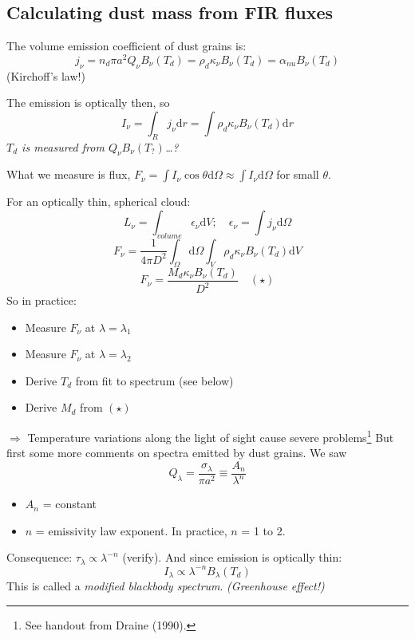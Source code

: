 \documentclass[12pt]{article}
\newcommand{\mar}[1]{\hspace{0pt}\marginpar{-\textcolor{black}{#1}-}}
\newcommand{\mynotes}[1]{{\fontfamily{cmss}\selectfont \textit{#1}}}
\begin{document}
\subsection{Calculating dust mass from FIR fluxes}
The volume emission coefficient of dust grains is:
\[
    j_{\nu}
    = n_{d} \pi a^{2} Q_{\nu} B_{\nu} (T_{d})
    = \rho_{d} \kappa_{\nu} B_{\nu} (T_{d})
    = \alpha_{nu} B_{\nu} (T_{d})
    \]
(Kirchoff's law!)

\mar{107}The emission is optically then, so
\[
    I_{\nu}
    = \int_{R}{
        j_{\nu} \mathrm{d}r}
    = \int{
        \rho_{d} \kappa_{\nu} B_{\nu} (T_{d}) \mathrm{d}r}
    \]
\mynotes{$T_{d}$ is measured from $Q_{\nu}B_{\nu}(T_{?})$\ldots ?}

What we measure is flux,
$F_{\nu} = \int I_{\nu} \cos \theta \mathrm{d}\Omega
\approx \int I_{\nu} \mathrm{d}\Omega $ for small $\theta$.

For an optically thin, spherical cloud:
\[
    L_{\nu} = \int_{volume} \epsilon_{\nu} \mathrm{d}V; \quad
    \epsilon_{\nu} = \int j_{\nu} \mathrm{d}\Omega
    \]
\[
    F_{\nu}
    = \frac{1}{4{\pi}D^{2}} \int_{\Omega}{
        \mathrm{d}\Omega \int_{V}{
            \rho_{d} \kappa_{\nu} B_{\nu} (T_{d}) \mathrm{d}V } }
    \]
\[
    \boxed{
    F_{\nu}
    = \frac{M_{d} \kappa_{\nu} B_{\nu} (T_{d})  }{D^{2}}}
    \quad (\star)
    \]
So in practice:
\begin{itemize}
    \item Measure $F_{\nu}$ at $\lambda = \lambda_{1}$
    \item Measure $F_{\nu}$ at $\lambda = \lambda_{2}$
    \item Derive $T_{d}$ from fit to spectrum (see below)
    \item Derive $M_{d}$ from $(\star)$
\end{itemize}
$\Rightarrow$ Temperature variations along the light of sight cause severe
problems\footnote{See handout from Draine (1990).}
\mar{108}But first some more comments on spectra emitted by dust grains.
We saw
\[
    Q_{\lambda}
    = \frac{\sigma_{\lambda}}{{\pi}a^{2}}
    \equiv \frac{A_{n}}{\lambda^{n}}
    \]
\begin{itemize}
    \item $A_{n}$ = constant
    \item $n$ = emissivity law exponent. In practice, $n$ = 1 to 2.
\end{itemize}
Consequence: $\tau_{\lambda} \propto \lambda^{-n}$
(verify). And since emission is optically thin:
\[
    I_{\lambda} \propto \lambda^{-n} B_{\lambda} (T_{d})
    \]
This is called a \textit{modified blackbody spectrum}.
\mynotes{(Greenhouse effect!)}
\end{document}
